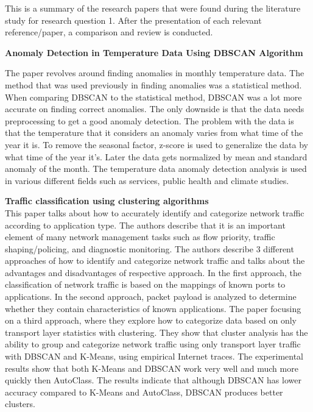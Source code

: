 \documentclass[a4paper]{article}
\begin{document}
This is a summary of the research papers that were found during the literature study for research question 1. After the presentation of each relevant reference/paper, a comparison and review is conducted.  

\textbf{Anomaly Detection in Temperature Data Using
DBSCAN Algorithm}\cite{temperatur}

The paper revolves around finding anomalies in monthly temperature data. The method that was used previously in finding anomalies was a statistical method. When comparing DBSCAN to the statistical method, DBSCAN was a lot more accurate on finding correct anomalies. The only downside is that the data needs preprocessing to get a good anomaly detection. The problem with the data is that the temperature that it considers an anomaly varies from what time of the year it is. To remove the seasonal factor, z-score is used to generalize the data by what time of the year it's. Later the data gets normalized by mean and standard anomaly of the month.
The temperature data anomaly detection analysis is used in various different fields such as services, public health and climate studies.

\textbf{Traffic classification using clustering algorithms}\cite{erman2006traffic}\newline\\ 
This paper talks about how to accurately identify and categorize network traffic according to application type. The authors describe that it is an important element of many network management tasks such as flow priority, traffic shaping/policing, and diagnostic monitoring. The authors describe 3 different approaches of how to identify and categorize network traffic and talks about the advantages and disadvantages of respective approach. In the first approach, the classification of network traffic is based on the mappings of known ports to applications. In the second approach, packet payload is analyzed to determine whether they contain characteristics of known applications. The paper focusing on a third approach, where they explore how to categorize data based on only transport layer statistics with clustering. They show that cluster analysis has the ability to group and categorize network traffic using only transport layer traffic with DBSCAN and K-Means, using empirical Internet traces. The experimental results show that both K-Means and DBSCAN work very well and much more quickly then AutoClass. The results indicate that although DBSCAN has lower accuracy compared to K-Means and AutoClass, DBSCAN produces better clusters.
\end{document}
